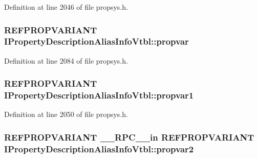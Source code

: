 Definition at line 2046 of file propsys.\+h.

\subsubsection[{\texorpdfstring{propvar}{propvar}}]{ {\bf R\+E\+F\+P\+R\+O\+P\+V\+A\+R\+I\+A\+NT} I\+Property\+Description\+Alias\+Info\+Vtbl\+::propvar}\hypertarget{struct_i_property_description_alias_info_vtbl_a5ead054ffec6a5fef18270c10f8dcdc6}{}\label{struct_i_property_description_alias_info_vtbl_a5ead054ffec6a5fef18270c10f8dcdc6}


Definition at line 2084 of file propsys.\+h.

\subsubsection[{\texorpdfstring{propvar1}{propvar1}}]{ {\bf R\+E\+F\+P\+R\+O\+P\+V\+A\+R\+I\+A\+NT} I\+Property\+Description\+Alias\+Info\+Vtbl\+::propvar1}\hypertarget{struct_i_property_description_alias_info_vtbl_a35d1cea51196d5aa067496ecaa8bf5ee}{}\label{struct_i_property_description_alias_info_vtbl_a35d1cea51196d5aa067496ecaa8bf5ee}


Definition at line 2050 of file propsys.\+h.

\subsubsection[{\texorpdfstring{propvar2}{propvar2}}]{ {\bf R\+E\+F\+P\+R\+O\+P\+V\+A\+R\+I\+A\+NT} {\bf \+\_\+\+\_\+\+R\+P\+C\+\_\+\+\_\+in} {\bf R\+E\+F\+P\+R\+O\+P\+V\+A\+R\+I\+A\+NT} I\+Property\+Description\+Alias\+Info\+Vtbl\+::propvar2}\hypertarget{struct_i_property_description_alias_info_vtbl_aa266cdbe188c308d387be76be317a161}{}\label{struct_i_property_description_alias_info_vtbl_aa266cdbe188c308d387be76be317a161}


